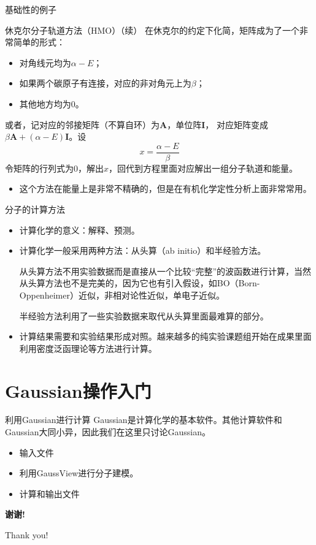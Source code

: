 \documentclass[10pt,compress,t]{ctexbeamer}
\begin{document}
\begin{frame}{基础性的例子}
  \begin{block}{休克尔分子轨道方法（HMO）（续）}
    在休克尔的约定下化简，矩阵成为了一个非常简单的形式：
    \begin{itemize}
      \item 对角线元均为$\alpha-E$；
      \item 如果两个碳原子有连接，对应的非对角元上为$\beta$；
      \item 其他地方均为0。
    \end{itemize}
    或者，记对应的邻接矩阵（不算自环）为$\mathbf{A}$，单位阵$\mathbf{I}$，
    对应矩阵变成$\beta \mathbf{A} + (\alpha - E) \mathbf{I} $。设
    $$ x = \frac{\alpha - E}{\beta} $$
    令矩阵的行列式为0，解出$x$，回代到方程里面对应解出一组分子轨道和能量。
  \end{block}
  \begin{itemize}
    \item 这个方法在能量上是非常不精确的，但是在有机化学定性分析上面非常常用。
  \end{itemize}
\end{frame}

\begin{frame}{分子的计算方法}
  \begin{itemize}
    \item 计算化学的意义：解释、预测。
    \item 计算化学一般采用两种方法：从头算（ab initio）和半经验方法。
    
    从头算方法不用实验数据而是直接从一个比较“完整”的波函数进行计算，当然从头算方法也不是完美的，因为它也有引入假设，如BO（Born-Oppenheimer）近似，非相对论性近似，单电子近似。
    
    半经验方法利用了一些实验数据来取代从头算里面最难算的部分。
    \item 计算结果需要和实验结果形成对照。越来越多的纯实验课题组开始在成果里面利用密度泛函理论等方法进行计算。
  \end{itemize}
\end{frame}

\section{Gaussian操作入门}
\begin{frame}{利用Gaussian进行计算}
  Gaussian是计算化学的基本软件。其他计算软件和Gaussian大同小异，因此我们在这里只讨论Gaussian。
  \begin{itemize}
    \item 输入文件
    \item 利用GaussView进行分子建模。
    \item 计算和输出文件
  \end{itemize}

\end{frame}

\begin{frame}[c,plain]
\begin{center}
\Huge\color{blue}\heiti\bfseries 谢\quad 谢!

  Thank you!
\end{center}
\end{frame}
\end{document}
